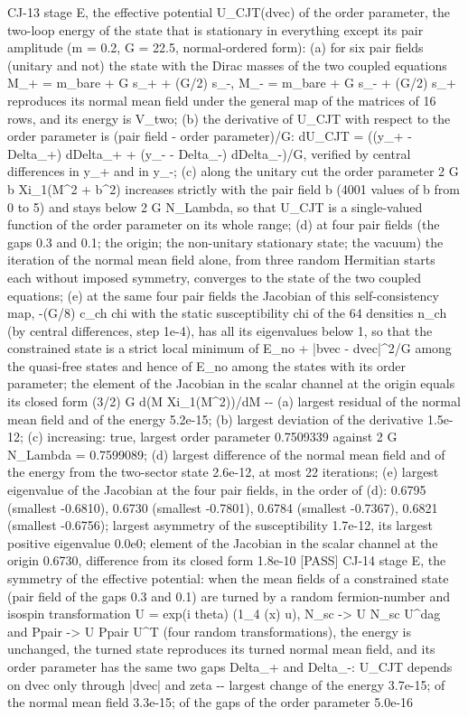 \documentclass[
  10pt,
]{article}
\newenvironment{Shaded}{}{}
\newcommand{\NormalTok}[1]{#1}
\begin{document}
\begin{Shaded}
\begin{Highlighting}[]
\NormalTok{[PASS] CJ{-}13  stage E, the effective potential U\_CJT(dvec) of the order parameter, the two{-}loop energy of the state that is stationary in everything except its pair amplitude (m = 0.2, G = 22.5, normal{-}ordered form): (a) for six pair fields (unitary and not) the state with the Dirac masses of the two coupled equations M\_+ = m\_bare + G s\_+ + (G/2) s\_{-}, M\_{-} = m\_bare + G s\_{-} + (G/2) s\_+ reproduces its normal mean field under the general map of the matrices of 16 rows, and its energy is V\_two; (b) the derivative of U\_CJT with respect to the order parameter is (pair field {-} order parameter)/G: dU\_CJT = ((y\_+ {-} Delta\_+) dDelta\_+ + (y\_{-} {-} Delta\_{-}) dDelta\_{-})/G, verified by central differences in y\_+ and in y\_{-}; (c) along the unitary cut the order parameter 2 G b Xi\_1(M\^{}2 + b\^{}2) increases strictly with the pair field b (4001 values of b from 0 to 5) and stays below 2 G N\_Lambda, so that U\_CJT is a single{-}valued function of the order parameter on its whole range; (d) at four pair fields (the gaps 0.3 and 0.1; the origin; the non{-}unitary stationary state; the vacuum) the iteration of the normal mean field alone, from three random Hermitian starts each without imposed symmetry, converges to the state of the two coupled equations; (e) at the same four pair fields the Jacobian of this self{-}consistency map, {-}(G/8) c\_ch chi with the static susceptibility chi of the 64 densities n\_ch (by central differences, step 1e{-}4), has all its eigenvalues below 1, so that the constrained state is a strict local minimum of E\_no + |bvec {-} dvec|\^{}2/G among the quasi{-}free states and hence of E\_no among the states with its order parameter; the element of the Jacobian in the scalar channel at the origin equals its closed form (3/2) G d(M Xi\_1(M\^{}2))/dM  {-}{-} (a) largest residual of the normal mean field and of the energy 5.2e{-}15; (b) largest deviation of the derivative 1.5e{-}12; (c) increasing: true, largest order parameter 0.7509339 against 2 G N\_Lambda = 0.7599089; (d) largest difference of the normal mean field and of the energy from the two{-}sector state 2.6e{-}12, at most 22 iterations; (e) largest eigenvalue of the Jacobian at the four pair fields, in the order of (d): 0.6795 (smallest {-}0.6810), 0.6730 (smallest {-}0.7801), 0.6784 (smallest {-}0.7367), 0.6821 (smallest {-}0.6756); largest
asymmetry of the susceptibility 1.7e{-}12, its largest positive eigenvalue 0.0e0; element of the Jacobian in the scalar channel at the origin 0.6730, difference from its closed form 1.8e{-}10}
\NormalTok{[PASS] CJ{-}14  stage E, the symmetry of the effective potential: when the mean fields of a constrained state (pair field of the gaps 0.3 and 0.1) are turned by a random fermion{-}number and isospin transformation U = exp(i theta) (1\_4 (x) u), N\_sc {-}\textgreater{} U N\_sc U\^{}dag and Ppair {-}\textgreater{} U Ppair U\^{}T (four random transformations), the energy is unchanged, the turned state reproduces its turned normal mean field, and its order parameter has the same two gaps Delta\_+ and Delta\_{-}: U\_CJT depends on dvec only through |dvec| and zeta  {-}{-} largest change of the energy 3.7e{-}15; of the normal mean field 3.3e{-}15; of the gaps of the order parameter 5.0e{-}16}

\end{Highlighting}
\end{Shaded}
\end{document}
